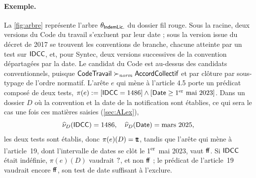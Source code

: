 \documentclass[review]{jflart}
\begin{document}
\paragraph{Exemple.} La \autoref{fig:arbre} représente l'arbre
\(\theta_{\mathsf{IndemLic.}}\) du dossier fil rouge. Sous la racine, deux versions du Code
du travail s'excluent par leur date ; sous la version issue du décret de 2017
se trouvent les conventions de branche, chacune atteinte par un test sur
\(\mathsf{IDCC}\), et, pour Syntec, deux versions successives de la convention départagées par la date. 
Le candidat du Code est au-dessus des candidats conventionnels,
puisque \(\mathsf{CodeTravail}\succ_{\mathit{norm}}\mathsf{AccordCollectif}\) et par clôture par sous-typage
de l'ordre normatif. L'arête \(e\) qui mène à l'article 4.5 porte un prédicat
composé de deux tests, \(\pi(e):=[\mathsf{IDCC}=1486]\land[\mathsf{Date}\geq\text{1\textsuperscript{er} mai 2023}]\).
Dans un dossier \(D\) où la convention et la date de la notification sont
établies, ce qui sera le cas une fois ces matières saisies
(\autoref{sec:ALex}),
\[
 \widehat \nu_D(\mathsf{IDCC})= 1486,\quad
 \widehat \nu_D(\mathsf{Date})=\text{mars 2025},
\]
les deux tests sont établis, donc \(\pi(e)(D)={\mathsf{t\!t}}\), tandis que l'arête qui
mène à l'article~19, dont l'intervalle de dates se clôt le
1\textsuperscript{er}~mai 2023, vaut \({\mathsf{f\!f}}\). Si
\(\mathsf{IDCC}\) était indéfinie, \(\pi(e)(D)\) vaudrait \(\mathord{?}\), et non
\({\mathsf{f\!f}}\) ; le prédicat de l'article~19 vaudrait encore \({\mathsf{f\!f}}\), son test
de date suffisant à l'exclure.
\end{document}
